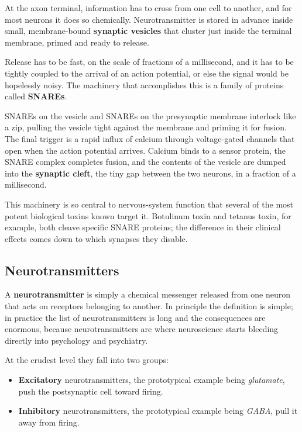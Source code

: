 \documentclass[11pt]{article}
\begin{document}
At the axon terminal, information has to cross from one cell to another, and for most neurons it does so chemically. Neurotransmitter is stored in advance inside small, membrane-bound \textbf{synaptic vesicles} that cluster just inside the terminal membrane, primed and ready to release.

Release has to be fast, on the scale of fractions of a millisecond, and it has to be tightly coupled to the arrival of an action potential, or else the signal would be hopelessly noisy. The machinery that accomplishes this is a family of proteins called \textbf{SNAREs}.

SNAREs on the vesicle and SNAREs on the presynaptic membrane interlock like a zip, pulling the vesicle tight against the membrane and priming it for fusion. The final trigger is a rapid influx of calcium through voltage-gated channels that open when the action potential arrives. Calcium binds to a sensor protein, the SNARE complex completes fusion, and the contents of the vesicle are dumped into the \textbf{synaptic cleft}, the tiny gap between the two neurons, in a fraction of a millisecond.

This machinery is so central to nervous-system function that several of the most potent biological toxins known target it. Botulinum toxin and tetanus toxin, for example, both cleave specific SNARE proteins; the difference in their clinical effects comes down to which synapses they disable.

\subsection{Neurotransmitters}

A \textbf{neurotransmitter} is simply a chemical messenger released from one neuron that acts on receptors belonging to another. In principle the definition is simple; in practice the list of neurotransmitters is long and the consequences are enormous, because neurotransmitters are where neuroscience starts bleeding directly into psychology and psychiatry.

At the crudest level they fall into two groups:

\begin{itemize}
    \item \textbf{Excitatory} neurotransmitters, the prototypical example being \textit{glutamate}, push the postsynaptic cell toward firing.
    \item \textbf{Inhibitory} neurotransmitters, the prototypical example being \textit{GABA}, pull it away from firing.
\end{itemize}
\end{document}

